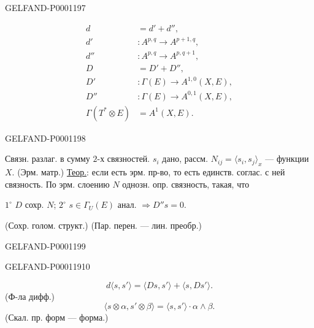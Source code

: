 \begin{GelfandAdjacentEvidence}{GELFAND-P000119}{7}


\begin{align*}
d&=d'+d'',\\
d'&:A^{p,q}\longrightarrow A^{p+1,q},\\
d''&:A^{p,q}\longrightarrow A^{p,q+1},\\
D&=D'+D'',\\
D'&:\Gamma(E)\longrightarrow A^{1,0}(X,E),\\
D''&:\Gamma(E)\longrightarrow A^{0,1}(X,E),\\
\Gamma(T^*\otimes E)&=A^1(X,E).
\end{align*}
\end{GelfandAdjacentEvidence}
\begin{GelfandAdjacentEvidence}{GELFAND-P000119}{8}

Связн. разлаг. в сумму $2$-х связностей.
$s_i$ дано, рассм. $N_{ij}=\langle s_i,s_j\rangle_x$ — функции $X$. (Эрм. матр.)
\underline{Теор.}: если есть эрм. пр-во, то есть единств. соглас. с ней связность.
По эрм. слоению $N$ однозн. опр. связность, такая, что

$1^\circ$ $D$ сохр. $N$;
$2^\circ$ $s\in\Gamma_U(E)$ анал. $\Rightarrow D''s=0$.

(Сохр. голом. структ.) (Пар. перен. — лин. преобр.)
\end{GelfandAdjacentEvidence}
\begin{GelfandAdjacentEvidence}{GELFAND-P000119}{9}

\end{GelfandAdjacentEvidence}
\begin{GelfandAdjacentEvidence}{GELFAND-P000119}{10}


\begin{equation*}
d\langle s,s'\rangle=\langle Ds,s'\rangle+\langle s,Ds'\rangle.
\end{equation*}
(Ф-ла дифф.)
\begin{equation*}
\langle s\otimes\alpha,s'\otimes\beta\rangle
=\langle s,s'\rangle\cdot\alpha\wedge\beta.
\end{equation*}
(Скал. пр. форм — форма.)
\end{GelfandAdjacentEvidence}
